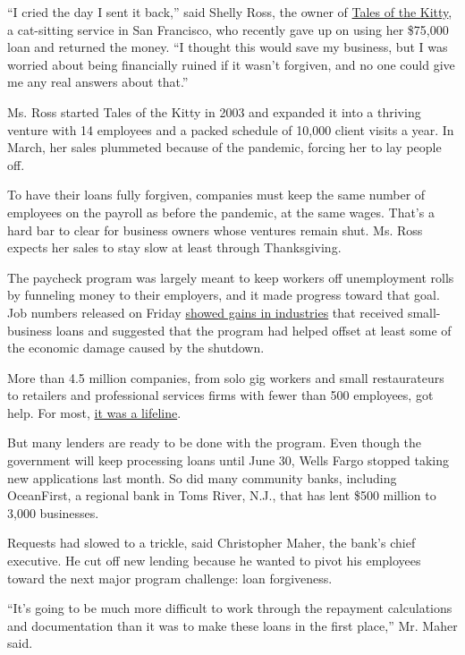 ``I cried the day I sent it back,'' said Shelly Ross, the owner of
\href{https://talesofthekitty.com/}{Tales of the Kitty}, a cat-sitting
service in San Francisco, who recently gave up on using her \$75,000
loan and returned the money. ``I thought this would save my business,
but I was worried about being financially ruined if it wasn't forgiven,
and no one could give me any real answers about that.''

Ms. Ross started Tales of the Kitty in 2003 and expanded it into a
thriving venture with 14 employees and a packed schedule of 10,000
client visits a year. In March, her sales plummeted because of the
pandemic, forcing her to lay people off.

To have their loans fully forgiven, companies must keep the same number
of employees on the payroll as before the pandemic, at the same wages.
That's a hard bar to clear for business owners whose ventures remain
shut. Ms. Ross expects her sales to stay slow at least through
Thanksgiving.

The paycheck program was largely meant to keep workers off unemployment
rolls by funneling money to their employers, and it made progress toward
that goal. Job numbers released on Friday
\href{https://www.nytimes.com/2020/06/05/business/economy/jobs-report.html}{showed
gains in industries} that received small-business loans and suggested
that the program had helped offset at least some of the economic damage
caused by the shutdown.

More than 4.5 million companies, from solo gig workers and small
restaurateurs to retailers and professional services firms with fewer
than 500 employees, got help. For most,
\href{https://www.nytimes.com/2020/05/31/business/virus-ppp-loan-small-businesses.html}{it
was a lifeline}.

But many lenders are ready to be done with the program. Even though the
government will keep processing loans until June 30, Wells Fargo stopped
taking new applications last month. So did many community banks,
including OceanFirst, a regional bank in Toms River, N.J., that has lent
\$500 million to 3,000 businesses.

Requests had slowed to a trickle, said Christopher Maher, the bank's
chief executive. He cut off new lending because he wanted to pivot his
employees toward the next major program challenge: loan forgiveness.

``It's going to be much more difficult to work through the repayment
calculations and documentation than it was to make these loans in the
first place,'' Mr. Maher said.


